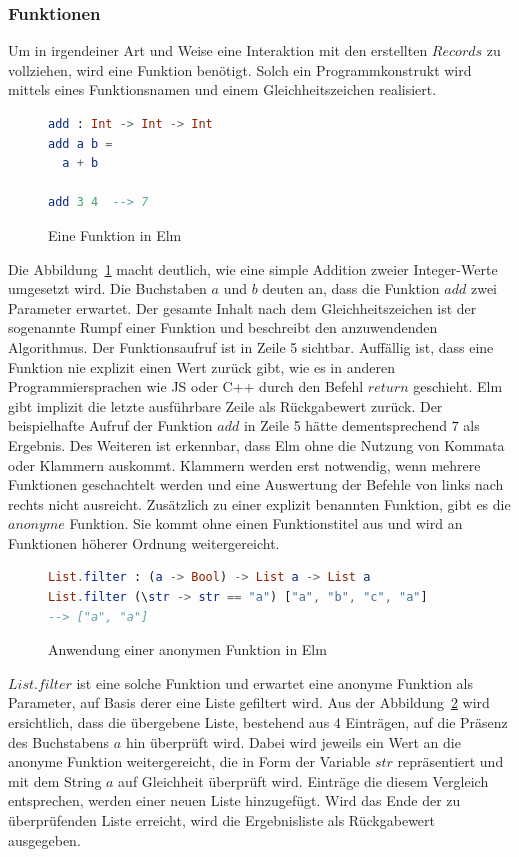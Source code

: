 \subsubsection{Funktionen}
\label{sec:Funktionen}
Um in irgendeiner Art und Weise eine Interaktion mit den erstellten $Records$ zu vollziehen, wird eine Funktion benötigt. Solch ein Programmkonstrukt wird mittels eines Funktionsnamen und einem Gleichheitszeichen realisiert.
\begin{figure}[h]
\begin{lstlisting}[language=Elm]
add : Int -> Int -> Int
add a b =
  a + b

add 3 4  --> 7
\end{lstlisting}
\caption{Eine Funktion in Elm}\label{fig:elm-function}
\end{figure}
Die Abbildung~\ref{fig:elm-function} macht deutlich, wie eine simple Addition zweier Integer-Werte umgesetzt wird. Die Buchstaben $a$ und $b$ deuten an, dass die Funktion $add$ zwei Parameter erwartet. Der gesamte Inhalt nach dem Gleichheitszeichen ist der sogenannte Rumpf einer Funktion und beschreibt den anzuwendenden Algorithmus. Der Funktionsaufruf ist in Zeile 5 sichtbar. Auffällig ist, dass eine Funktion nie explizit einen Wert zurück gibt, wie es in anderen Programmiersprachen wie \ac{JS} oder C++ durch den Befehl $return$ geschieht. Elm gibt implizit die letzte ausführbare Zeile als Rückgabewert zurück. Der beispielhafte Aufruf der Funktion $add$ in Zeile 5 hätte dementsprechend $7$ als Ergebnis. Des Weiteren ist erkennbar, dass Elm ohne die Nutzung von Kommata oder Klammern auskommt. Klammern werden erst notwendig, wenn mehrere Funktionen geschachtelt werden und eine Auswertung der Befehle von links nach rechts nicht ausreicht.
Zusätzlich zu einer explizit benannten Funktion, gibt es die $anonyme$ Funktion. Sie kommt ohne einen Funktionstitel aus und wird an Funktionen höherer Ordnung weitergereicht.
\begin{figure}[h]
\begin{lstlisting}[language=Elm]
List.filter : (a -> Bool) -> List a -> List a
List.filter (\str -> str == "a") ["a", "b", "c", "a"]
--> ["a", "a"]
\end{lstlisting}
\caption{Anwendung einer anonymen Funktion in Elm}\label{fig:elm-anonym-function}
\end{figure}
$List.filter$ ist eine solche Funktion und erwartet eine anonyme Funktion als Parameter, auf Basis derer eine Liste gefiltert wird. Aus der Abbildung~\ref{fig:elm-anonym-function} wird ersichtlich, dass die übergebene Liste, bestehend aus $4$ Einträgen, auf die Präsenz des Buchstabens $a$ hin überprüft wird. Dabei wird jeweils ein Wert an die anonyme Funktion weitergereicht, die in Form der Variable $str$ repräsentiert und mit dem String $a$ auf Gleichheit überprüft wird. Einträge die diesem Vergleich entsprechen, werden einer neuen Liste hinzugefügt. Wird das Ende der zu überprüfenden Liste erreicht, wird die Ergebnisliste als Rückgabewert ausgegeben.

